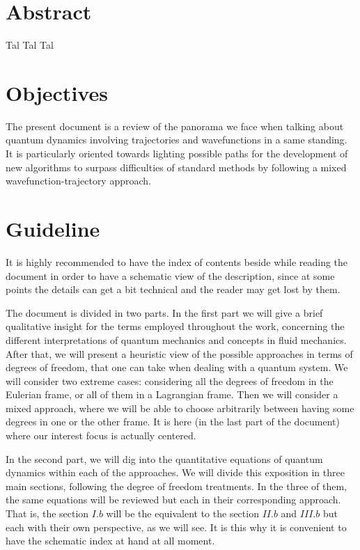 \documentclass[11pt, a4paper]{article} %
\begin{document}
%
\pagestyle{empty}

\section*{Abstract}
Tal Tal Tal

\section*{Objectives}\vspace{-0.2cm}
The present document is a review of the panorama we face when talking about quantum dynamics involving trajectories and wavefunctions in a same standing. It is particularly oriented towards lighting possible paths for the development of new algorithms to surpass difficulties of standard methods by following a mixed wavefunction-trajectory approach.


\section*{Guideline}\vspace{-0.2cm}

It is highly recommended to have the index of contents beside while reading the document in order to have a schematic view of the description, since at some points the details can get a bit technical and the reader may get lost by them.

The document is divided in two parts. In the first part we will give a brief qualitative insight for the terms employed throughout the work, concerning the different interpretations of quantum mechanics and concepts in fluid mechanics. After that, we will present a heuristic view of the possible approaches in terms of degrees of freedom, that one can take when dealing with a quantum system. We will consider two extreme cases: considering all the degrees of freedom in the Eulerian frame, or all of them in a Lagrangian frame. Then we will consider a mixed approach, where we will be able to choose arbitrarily between having some degrees in one or the other frame. It is here (in the last part of the document) where our interest focus is actually centered.

In the second part, we will dig into the quantitative equations of quantum dynamics within each of the approaches. We will divide this exposition in three main sections, following the degree of freedom treatments. In the three of them, the same equations will be reviewed but each in their corresponding approach. That is, the section $I.b$ will be the equivalent to the section $II.b$ and $III.b$ but each with their own perspective, as we will see. It is this why it is convenient to have the schematic index at hand at all moment.
\end{document}
